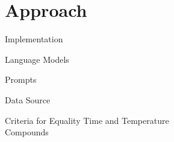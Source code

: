 \section{Approach}

\begin{frame}[c]{Implementation}
\end{frame}


\begin{frame}[c]{Language Models}
\end{frame}


\begin{frame}[c]{Prompts}
\end{frame}


\begin{frame}[c]{Data Source}
\end{frame}


\begin{frame}[c]{Criteria for Equality}
    Time and Temperature \\
    Compounds
\end{frame}
